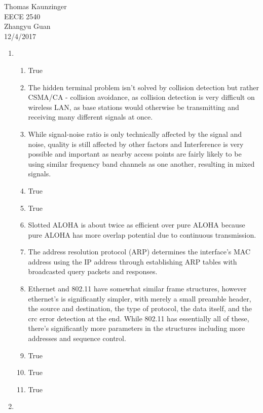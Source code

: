 \documentclass[12pt]{article}
\begin{document}
\noindent Thomas Kaunzinger\\
EECE 2540\\
Zhangyu Guan\\
12/4/2017\\
\begin{enumerate}

	\item \begin{enumerate}

			\item True
			\item The hidden terminal problem isn't solved by collision detection but rather CSMA/CA - collision avoidance, as collision detection is very difficult on wireless LAN, as base stations would otherwise be transmitting and receiving many different signals at once.
			\item While signal-noise ratio is only technically affected by the signal and noise, quality is still affected by other factors and Interference is very possible and important as nearby access points are fairly likely to be using similar frequency band channels as one another, resulting in mixed signals.
			\item True
			\item True
			\item Slotted ALOHA is about twice as efficient over pure ALOHA because pure ALOHA has more overlap potential due to continuous transmission.
			\item The address resolution protocol (ARP) determines the interface's MAC address using the IP address through establishing ARP tables with broadcasted query packets and responses.
			\item Ethernet and 802.11 have somewhat similar frame structures, however ethernet's is significantly simpler, with merely a small preamble header, the source and destination, the type of protocol, the data itself, and the crc error detection at the end. While 802.11 has essentially all of these, there's significantly more parameters in the structures including more addresses and sequence control.
			\item True
			\item True
			\item True

		\end{enumerate}

	\item \begin{enumerate}


\end{enumerate}
\end{enumerate}
\end{document}
